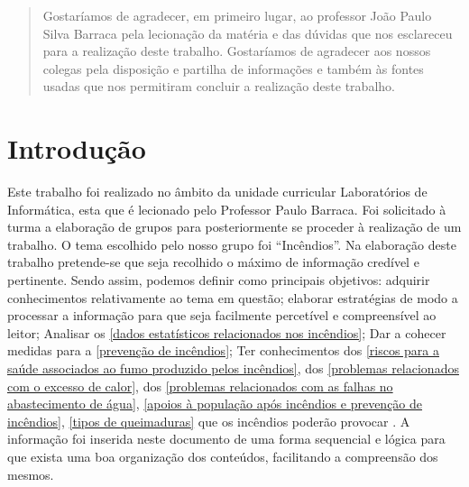 \documentclass{report}
\begin{document}
\renewcommand{\abstractname}{Agradecimentos}
\begin{abstract}
Gostaríamos de agradecer, em primeiro lugar, ao professor João Paulo Silva Barraca pela lecionação da matéria e das dúvidas que nos esclareceu para a realização deste trabalho. Gostaríamos de agradecer aos nossos colegas pela disposição e partilha de informações e também às fontes usadas que nos permitiram concluir a realização deste trabalho.
\end{abstract}


\tableofcontents


\clearpage
{}


\chapter{Introdução}

Este trabalho foi realizado no âmbito da unidade curricular Laboratórios de Informática, esta que é lecionado pelo Professor Paulo Barraca. Foi solicitado à turma a elaboração de grupos para posteriormente se proceder à realização de um trabalho. O tema escolhido pelo nosso grupo foi “Incêndios”.
Na elaboração deste trabalho pretende-se que seja recolhido o máximo de informação credível e pertinente.
Sendo assim, podemos definir como principais objetivos: adquirir conhecimentos relativamente ao tema em questão; elaborar estratégias de modo a processar a informação para que seja facilmente percetível e compreensível ao leitor; Analisar os \autoref{dados estatísticos relacionados nos incêndios}; Dar a cohecer medidas para a \autoref{prevenção de incêndios}; Ter conhecimentos dos \autoref{riscos para a saúde associados ao fumo produzido pelos incêndios}, dos \autoref{problemas relacionados com o excesso de calor}, dos \autoref{problemas relacionados com as falhas no abastecimento de água}, \autoref{apoios à população após incêndios e prevenção de incêndios}, \autoref{tipos de queimaduras} que os incêndios poderão provocar .
A informação foi inserida neste documento de uma forma sequencial e lógica para que exista uma boa organização dos conteúdos, facilitando a compreensão dos mesmos.

\end{document}
